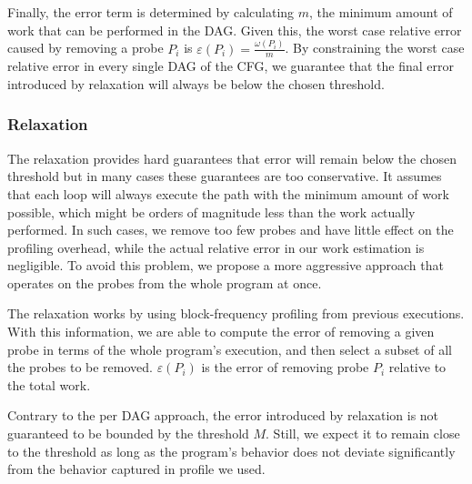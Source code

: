 Finally, the error term is determined by calculating $m$, the minimum amount of work that can be performed in the
DAG. Given this, the worst case relative error caused by removing a probe $P_i$ is $\varepsilon(P_i) = \frac{\omega(P_i)}{m}$.
By constraining the worst case
relative error in every single DAG of the CFG, we guarantee that the final error introduced by relaxation will always be below the chosen
threshold.


\subsubsection{\WPRelaxTitle Relaxation}

The \WCRelaxLower relaxation provides hard guarantees that error will remain below the chosen threshold but in many cases these
guarantees are too conservative. It assumes that each loop will always execute the path with the minimum amount of work
possible, which might be orders of magnitude less than the work actually performed. In such cases, we remove too few probes and have little
effect on the profiling overhead, while the actual relative error in our work estimation is negligible. To avoid this problem, we
propose a more aggressive approach that operates on the probes from the whole program at once.

The \WPRelaxLower relaxation works by using block-frequency profiling from previous executions. With this information, we are able to
compute the error of removing a given probe in terms of the whole program's execution, and then select a subset of all the probes to be
removed. $\varepsilon(P_i)$ is the error of removing probe $P_i$ relative to the total work.

Contrary to the per DAG approach, the error introduced by \WPRelaxLower relaxation is not guaranteed to be bounded by the threshold $M$.
Still, we expect it to remain close to the threshold as long as the program's behavior does not deviate significantly from the behavior
captured in profile we used.
